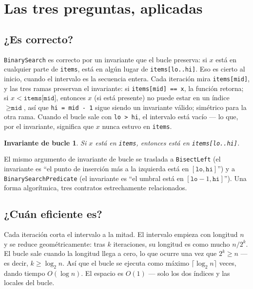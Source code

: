 \documentclass[11pt,a4paper]{article}
\newtheorem{invariante}{Invariante de bucle}
\begin{document}
\section{Las tres preguntas, aplicadas}

\subsection*{¿Es correcto?}

\texttt{BinarySearch} es correcto por un invariante que el bucle preserva: si $x$ está en cualquier parte de \texttt{items}, está en algún lugar de \texttt{items[lo..hi]}. Eso es cierto al inicio, cuando el intervalo es la secuencia entera. Cada iteración mira \texttt{items[mid]}, y las tres ramas preservan el invariante: si \texttt{items[mid] == x}, la función retorna; si $x < \texttt{items[mid]}$, entonces $x$ (si está presente) no puede estar en un índice $\ge \texttt{mid}$, así que \texttt{hi = mid - 1} sigue siendo un invariante válido; simétrico para la otra rama. Cuando el bucle sale con \texttt{lo > hi}, el intervalo está vacío --- lo que, por el invariante, significa que $x$ nunca estuvo en \texttt{items}.

\begin{invariante}
Si $x$ está en \texttt{items}, entonces está en \texttt{items[lo..hi]}.
\end{invariante}

El mismo argumento de invariante de bucle se traslada a \texttt{BisectLeft} (el invariante es ``el punto de inserción más a la izquierda está en $[\texttt{lo}, \texttt{hi}]$'') y a \texttt{BinarySearchPredicate} (el invariante es ``el umbral está en $[\texttt{lo}-1, \texttt{hi}]$''). Una forma algorítmica, tres contratos estrechamente relacionados.

\subsection*{¿Cuán eficiente es?}

Cada iteración corta el intervalo a la mitad. El intervalo empieza con longitud $n$ y se reduce geométricamente: tras $k$ iteraciones, su longitud es como mucho $n/2^k$. El bucle sale cuando la longitud llega a cero, lo que ocurre una vez que $2^k \ge n$ --- es decir, $k \ge \log_2 n$. Así que el bucle se ejecuta como máximo $\lceil \log_2 n \rceil$ veces, dando tiempo $O(\log n)$. El espacio es $O(1)$ --- solo los dos índices y las locales del bucle.
\end{document}
